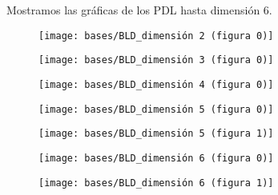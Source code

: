 Mostramos las gráficas de los PDL hasta dimensión $6$.
 
\begin{figure}[H]
	\centering
	\texttt{[image: bases/BLD\_dimensión 2 (figura 0)]}
\end{figure}

\begin{figure}[H]
	\centering
	\texttt{[image: bases/BLD\_dimensión 3 (figura 0)]}
\end{figure}

\begin{figure}[H]
	\centering
	\texttt{[image: bases/BLD\_dimensión 4 (figura 0)]}
\end{figure}

\begin{figure}[H]
	\centering
	\texttt{[image: bases/BLD\_dimensión 5 (figura 0)]}
\end{figure}


\begin{figure}[H]
	\centering
	\texttt{[image: bases/BLD\_dimensión 5 (figura 1)]}
\end{figure}

\begin{figure}[H]
	\centering
	\texttt{[image: bases/BLD\_dimensión 6 (figura 0)]}
\end{figure}

\begin{figure}[H]
	\centering
	\texttt{[image: bases/BLD\_dimensión 6 (figura 1)]}
\end{figure}